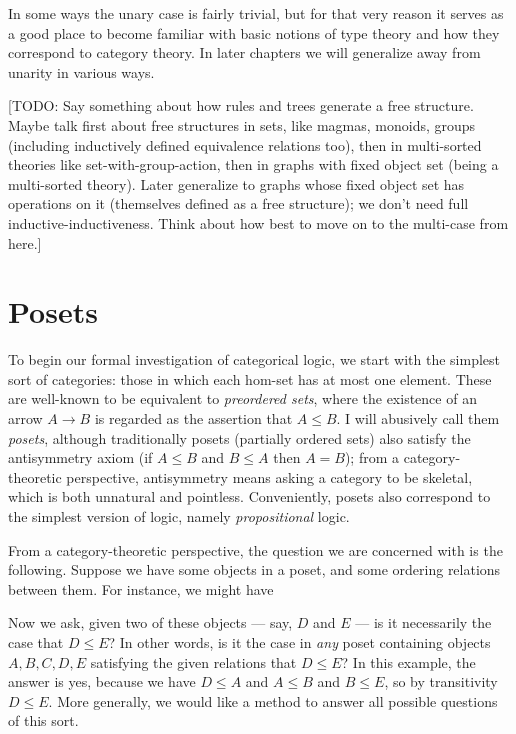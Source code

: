 \documentclass{book}
\begin{document}
In some ways the unary case is fairly trivial, but for that very reason it serves as a good place to become familiar with basic notions of type theory and how they correspond to category theory.
In later chapters we will generalize away from unarity in various ways.

[TODO: Say something about how rules and trees generate a free structure.  Maybe talk first about free structures in sets, like magmas, monoids, groups (including inductively defined equivalence relations too), then in multi-sorted theories like set-with-group-action, then in graphs with fixed object set (being a multi-sorted theory).  Later generalize to graphs whose fixed object set has operations on it (themselves defined as a free structure); we don't need full inductive-inductiveness.  Think about how best to move on to the multi-case from here.]


\section{Posets}
\label{sec:poset}

To begin our formal investigation of categorical logic, we start with the simplest sort of categories: those in which each hom-set has at most one element.
These are well-known to be equivalent to \emph{preordered sets}, where the existence of an arrow $A\to B$ is regarded as the assertion that $A\le B$.
I will abusively call them \emph{posets}, although traditionally posets (partially ordered sets) also satisfy the antisymmetry axiom (if $A\le B$ and $B\le A$ then $A=B$); from a category-theoretic perspective, antisymmetry means asking a category to be skeletal, which is both unnatural and pointless.
Conveniently, posets also correspond to the simplest version of logic, namely \emph{propositional} logic.

From a category-theoretic perspective, the question we are concerned with is the following.
Suppose we have some objects in a poset, and some ordering relations between them.
For instance, we might have
Now we ask, given two of these objects --- say, $D$ and $E$ --- is it necessarily the case that $D\le E$?
In other words, is it the case in \emph{any} poset containing objects $A,B,C,D,E$ satisfying the given relations that $D\le E$?
In this example, the answer is yes, because we have $D\le A$ and  $A\le B$ and $B\le E$, so by transitivity $D\le E$.
More generally, we would like a method to answer all possible questions of this sort.
\end{document}
